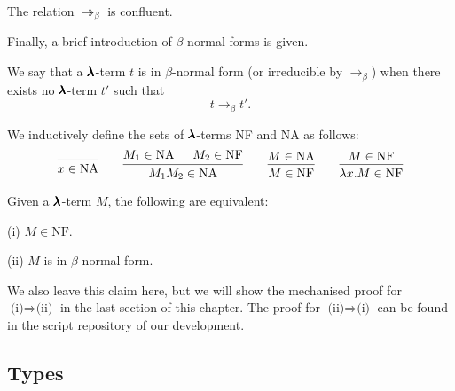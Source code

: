 \begin{claim}[Confluence]
  \label{confluence}
  The relation $\twoheadrightarrow_{\beta}$ is confluent. 
\end{claim}


Finally, a brief introduction of $\beta$-normal forms is given.

\begin{definition}
  We say that a $\pmb{\lambda}$-term $t$ is in $\beta$-normal form (or irreducible by $\to_\beta$) when there exists no $\pmb{\lambda}$-term $t'$ such that
  \[ t \to_\beta t' . \]
\end{definition}

\begin{definition}%
  \label{beta_nfs}
  We inductively define the sets of $\pmb{\lambda}$-terms NF and NA as follows:
  \[
    \begin{prooftree}
      \infer0{ x \in \text{NA} } 
    \end{prooftree}
    \qquad
    \begin{prooftree}
      \hypo{ M_1 \in \text{NA} }
      \hypo{ M_2 \in \text{NF} }            
      \infer2{ M_1 M_2 \in \text{NA} } 
    \end{prooftree}
    \qquad
    \begin{prooftree}
      \hypo{ M \in \text{NA} }
      \infer1{ M \in \text{NF} } 
    \end{prooftree}
    \qquad
    \begin{prooftree}
      \hypo{ M \in \text{NF} }
      \infer1{ \lambda x . M \in \text{NF} } 
    \end{prooftree}
  \]
\end{definition}


\begin{claim}
  \label{beta_nfs_claim}
  Given a $\pmb{\lambda}$-term $M$, the following are equivalent:

  (i) $M \in \text{NF}$.

  (ii) $M$ is in $\beta$-normal form.
\end{claim}

We also leave this claim here, but we will show the mechanised proof for $\boxed{\text{(i)} \Rightarrow \text{(ii)}}$ in the last section of this chapter.
The proof for $\boxed{\text{(ii)} \Rightarrow \text{(i)}}$ can be found in the script repository of our development.


\subsection{Types}

